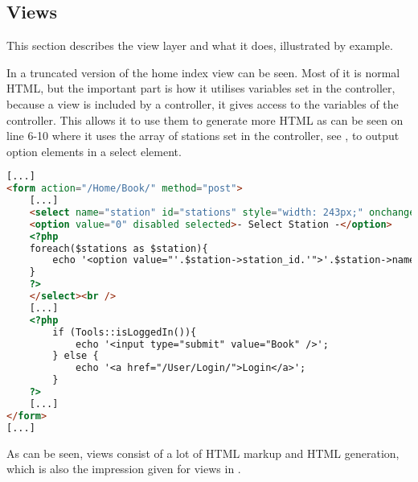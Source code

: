 \subsection{Views}
This section describes the view layer and what it does, illustrated by example.

In  a truncated version of the home index view can be seen. 
Most of it is normal HTML, but the important part is how it utilises variables set in the controller, because a view is included by a controller, it gives access to the variables of the controller. 
This allows it to use them to generate more HTML as can be seen on line 6-10 where it uses the array of stations set in the controller, see , to output option elements in a select element.

\begin{lstlisting}[language=html, label=lst:homeIndexView, caption={Home Index View.}]
[...]
<form action="/Home/Book/" method="post">
    [...]
    <select name="station" id="stations" style="width: 243px;" onchange="UpdateMarker()">
    <option value="0" disabled selected>- Select Station -</option>
    <?php
    foreach($stations as $station){
        echo '<option value="'.$station->station_id.'">'.$station->name.'</option>';
    }
    ?>
    </select><br />
    [...]
    <?php
        if (Tools::isLoggedIn()){
            echo '<input type="submit" value="Book" />';
        } else {
            echo '<a href="/User/Login/">Login</a>';
        }
    ?>
    [...]
</form>
[...]
\end{lstlisting}

As can be seen, views consist of a lot of HTML markup and HTML generation, which is also the impression given for views in .